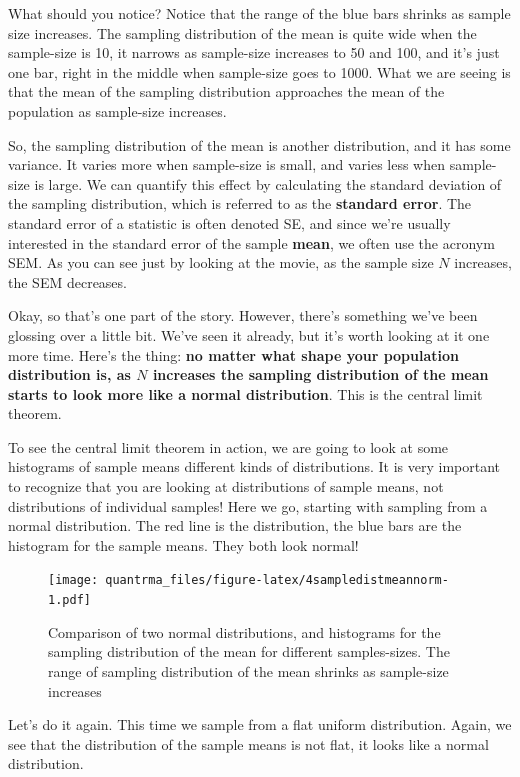 \documentclass[
]{book}
\begin{document}
What should you notice? Notice that the range of the blue bars shrinks as sample size increases. The sampling distribution of the mean is quite wide when the sample-size is 10, it narrows as sample-size increases to 50 and 100, and it's just one bar, right in the middle when sample-size goes to 1000. What we are seeing is that the mean of the sampling distribution approaches the mean of the population as sample-size increases.

So, the sampling distribution of the mean is another distribution, and it has some variance. It varies more when sample-size is small, and varies less when sample-size is large. We can quantify this effect by calculating the standard deviation of the sampling distribution, which is referred to as the \textbf{standard error}. The standard error of a statistic is often denoted SE, and since we're usually interested in the standard error of the sample \textbf{mean}, we often use the acronym SEM. As you can see just by looking at the movie, as the sample size \(N\) increases, the SEM decreases.

Okay, so that's one part of the story. However, there's something we've been glossing over a little bit. We've seen it already, but it's worth looking at it one more time. Here's the thing: \textbf{no matter what shape your population distribution is, as \(N\) increases the sampling distribution of the mean starts to look more like a normal distribution}. This is the central limit theorem.

To see the central limit theorem in action, we are going to look at some histograms of sample means different kinds of distributions. It is very important to recognize that you are looking at distributions of sample means, not distributions of individual samples! Here we go, starting with sampling from a normal distribution. The red line is the distribution, the blue bars are the histogram for the sample means. They both look normal!

\begin{figure}
\centering
\texttt{[image: quantrma\_files/figure-latex/4sampledistmeannorm-1.pdf]}
\caption{\label{fig:4sampledistmeannorm}Comparison of two normal distributions, and histograms for the sampling distribution of the mean for different samples-sizes. The range of sampling distribution of the mean shrinks as sample-size increases}
\end{figure}

Let's do it again. This time we sample from a flat uniform distribution. Again, we see that the distribution of the sample means is not flat, it looks like a normal distribution.
\end{document}
